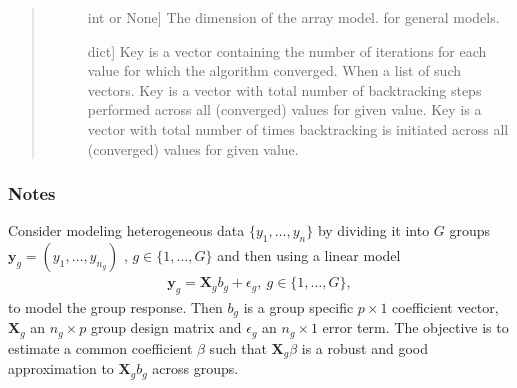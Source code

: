 \documentclass[letterpaper,10pt,english]{sphinxmanual}
\begin{document}
\begin{fulllineitems}
\begin{quote}
\begin{description}
\begin{description}
\item[{}] \leavevmode{[}int or None{]}
\sphinxAtStartPar
The dimension of the array model.  for general models.

\item[{}] \leavevmode{[}dict{]}
\sphinxAtStartPar
Key  is a vector containing the number of  iterations for each
 value for which the algorithm converged. When  a   
\sphinxhyphen{}list of such vectors. Key   is a   vector
with total number of backtracking steps performed across all (converged)  values 
for given  value. Key  is a   vector
with total number of times backtracking is initiated across all (converged)  values 
for given  value.

\end{description}

\end{description}\end{quote}
\subsubsection*{Notes}

\sphinxAtStartPar
Consider modeling heterogeneous data \(\{y_1,\ldots, y_n\}\) by dividing
it into \(G\) groups \(\mathbf{y}_g = (y_1, \ldots, y_{n_g})\) ,
\(g \in \{ 1,\ldots, G\}\) and then using a linear model
\begin{equation*}
\begin{split}\mathbf{y}_g = \mathbf{X}_gb_g + \epsilon_g, \  g \in \{1,\ldots, G\},\end{split}
\end{equation*}
\sphinxAtStartPar
to model the group response. Then \(b_g\) is a group specific \(p\times 1\)
coefficient vector, \(\mathbf{X}_g\) an \(n_g\times p\) group design matrix and
\(\epsilon_g\) an \(n_g\times 1\) error term. The objective is to estimate
a common coefficient \(\beta\) such that \(\mathbf{X}_g\beta\) is a robust
and good approximation to \(\mathbf{X}_gb_g\) across groups.


\end{fulllineitems}
\end{document}
